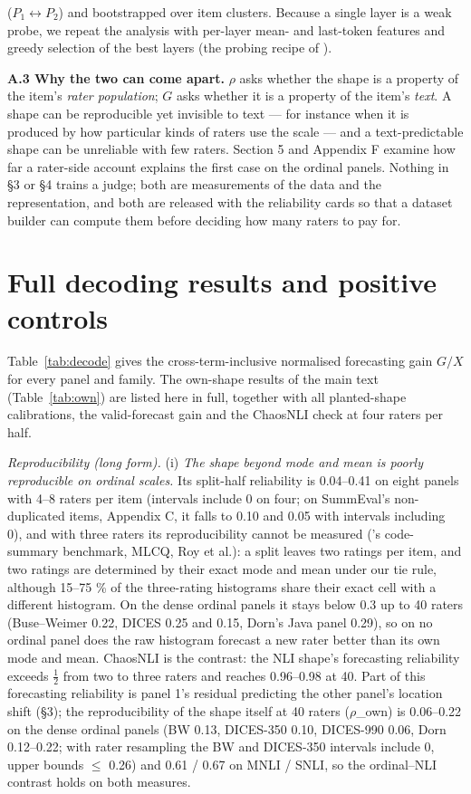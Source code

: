 \documentclass{article}
\begin{document}
(\(P_1\leftrightarrow P_2\)) and bootstrapped over item clusters. Because a single layer is a weak probe, we repeat the analysis with per-layer mean- and last-token features and greedy selection of the best layers (the probing recipe of \citealp{li2026rethinking}).

\textbf{A.3 Why the two can come apart.} \(\rho\) asks whether the shape is a property of the item's \emph{rater population}; \(G\) asks whether it is a property of the item's \emph{text}. A shape can be reproducible yet invisible to text --- for instance when it is produced by how particular kinds of raters use the scale --- and a text-predictable shape can be unreliable with few raters. Section 5 and Appendix F examine how far a rater-side account explains the first case on the ordinal panels. Nothing in \S{}3 or \S{}4 trains a judge; both are measurements of the data and the representation, and both are released with the reliability cards so that a dataset builder can compute them before deciding how many raters to pay for.

\section{Full decoding results and positive controls}


Table~\ref{tab:decode} gives the cross-term-inclusive normalised forecasting gain \(G/X\) for every panel and family. The own-shape results of the main text (Table~\ref{tab:own}) are listed here in full, together with all planted-shape calibrations, the valid-forecast gain and the ChaosNLI check at four raters per half.

\emph{Reproducibility (long form).} (i) \emph{The shape beyond mode and mean is poorly reproducible on ordinal scales.} Its split-half reliability is 0.04--0.41 on eight panels with 4--8 raters per item (intervals include 0 on four; on SummEval's non-duplicated items, Appendix C, it falls to 0.10 and 0.05 with intervals including 0), and with three raters its reproducibility cannot be measured (\citet{crupi2025effectiveness}'s code-summary benchmark, MLCQ, Roy et al.): a split leaves two ratings per item, and two ratings are determined by their exact mode and mean under our tie rule, although 15--75 \% of the three-rating histograms share their exact cell with a different histogram. On the dense ordinal panels it stays below 0.3 up to 40 raters (Buse--Weimer 0.22, DICES 0.25 and 0.15, Dorn's Java panel 0.29), so on no ordinal panel does the raw histogram forecast a new rater better than its own mode and mean. ChaosNLI is the contrast: the NLI shape's forecasting reliability exceeds $\tfrac12$ from two to three raters and reaches 0.96--0.98 at 40. Part of this forecasting reliability is panel 1's residual predicting the other panel's location shift (\S{}3); the reproducibility of the shape itself at 40 raters ($\rho$\_own) is 0.06--0.22 on the dense ordinal panels (BW 0.13, DICES-350 0.10, DICES-990 0.06, Dorn 0.12--0.22; with rater resampling the BW and DICES-350 intervals include 0, upper bounds $\leq$ 0.26) and 0.61 / 0.67 on MNLI / SNLI, so the ordinal--NLI contrast holds on both measures.
\end{document}
